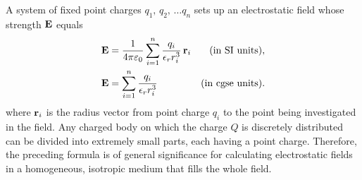  A system of fixed point charges $q_{1},\,q_{2},\, \ldots{} q_{n}$ sets up an electrostatic field whose strength $\vb{E}$ equals
\begin{align*}%
\vb{E} & = \ofpe \sum_{i=1}^{n} \frac{q_{i}}{\epsilon_{r} r_{i}^{3}}\, \vb{r}_{i} & \text{(in SI units)},\\
\vb{E} & = \sum_{i=1}^{n}  \frac{q_{i}}{\epsilon_{r} r_{i}^{3}} &\text{(in cgse units)}.
\end{align*}
where $\vb{r}_{i}$ is the radius vector from point charge $q_{i}$ to the point being investigated in the field. Any charged body on which the charge $Q$ is discretely distributed  can be divided into extremely small parts, each having a point charge. Therefore, the preceding formula is of general significance for calculating electrostatic fields in a homogeneous, isotropic medium that fills the whole field.

